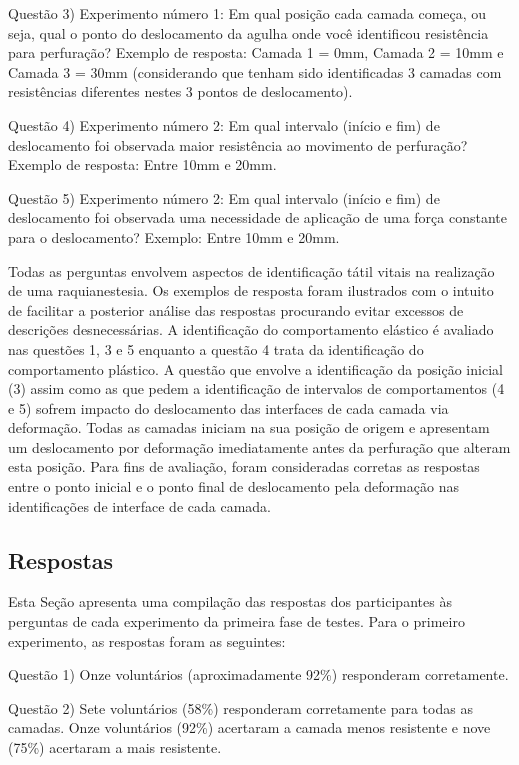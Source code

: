 Questão 3) Experimento número 1: Em qual posição cada camada começa, ou seja, qual o ponto do deslocamento da agulha onde você identificou resistência para perfuração? 
Exemplo de resposta: Camada 1 = 0mm, Camada 2 = 10mm e Camada 3 = 30mm (considerando que tenham sido identificadas 3 camadas com resistências diferentes nestes 3 pontos de deslocamento).

Questão 4) Experimento número 2: Em qual intervalo (início e fim) de deslocamento foi observada maior resistência ao movimento de perfuração? 
Exemplo de resposta: Entre 10mm e 20mm.

Questão 5) Experimento número 2: Em qual intervalo (início e fim) de deslocamento foi observada uma necessidade de aplicação de uma força constante para o deslocamento? 
Exemplo: Entre 10mm e 20mm.

Todas as perguntas envolvem aspectos de identificação tátil vitais na realização de uma raquianestesia. Os exemplos de resposta foram ilustrados com o intuito de facilitar a posterior análise das respostas procurando evitar excessos de descrições desnecessárias. A identificação do comportamento elástico é avaliado nas questões 1, 3 e 5 enquanto a questão 4 trata da identificação do comportamento plástico. A questão que envolve a identificação da posição inicial (3) assim como as que pedem a identificação de intervalos de comportamentos (4 e 5) sofrem impacto do deslocamento das interfaces de cada camada via deformação. Todas as camadas iniciam na sua posição de origem e apresentam um deslocamento por deformação imediatamente antes da perfuração que alteram esta posição. Para fins de avaliação, foram consideradas corretas as respostas entre o ponto inicial e o ponto final de deslocamento pela deformação nas identificações de interface de cada camada.  

\subsection{Respostas}
\label{sec:respostas}

Esta Seção apresenta uma compilação das respostas dos participantes às perguntas de cada experimento da primeira fase de testes. Para o primeiro experimento, as respostas foram as seguintes:

Questão 1) Onze voluntários (aproximadamente 92\%) responderam corretamente.

Questão 2) Sete voluntários (58\%) responderam corretamente para todas as camadas. Onze voluntários (92\%) acertaram a camada menos resistente e nove (75\%) acertaram a mais resistente.

